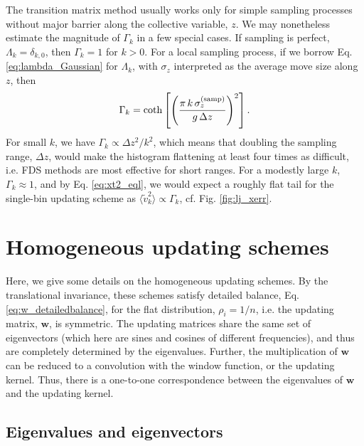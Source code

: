 \documentclass[reprint, superscriptaddress, floatfix]{revtex4-1}
\begin{document}
The transition matrix method usually works only for
simple sampling processes without major barrier
along the collective variable, $z$.
%
We may nonetheless estimate the magnitude of $\Gamma_k$
in a few special cases.
%
If sampling is perfect, $\Lambda_k = \delta_{k, 0}$,
then $\Gamma_k = 1$ for $k > 0$.
%
For a local sampling process,
if we borrow Eq. \eqref{eq:lambda_Gaussian}
for $\Lambda_k$,
with $\sigma_z$ interpreted as the average move size along $z$,
then
\begin{align}
\Gamma_k = \coth\left[
  \left(
    \frac{ \pi \, k \, \sigma_z^\mathrm{(samp)} } { g \, \Delta z}
  \right)^2
  \right].
  \notag
\end{align}
For small $k$,
we have $\Gamma_k \propto \Delta z^2/k^2$,\cite{bussi2006}
which means that doubling the sampling range, $\Delta z$,
would make the histogram flattening
at least four times as difficult,
i.e. FDS methods are most effective
for short ranges\cite{wang2001, wang2001pre}.
%
%
For a modestly large $k$,
$\Gamma_k \approx 1$,
and by Eq. \eqref{eq:xt2_eql},
we would expect a roughly flat tail
for the single-bin updating scheme
as $\langle \tilde v_k^2 \rangle \propto \Gamma_k$,
cf. Fig. \ref{fig:lj_xerr}.





\section{\label{sec:more_wband}
Homogeneous updating schemes
}


Here, we give some details
on the homogeneous updating schemes.
%
By the translational invariance,
these schemes
satisfy detailed balance,
Eq. \eqref{eq:w_detailedbalance},
for the flat distribution, $\rho_i = 1/n$,
i.e. the updating matrix, $\mathbf w$,
is symmetric.
%
The updating matrices
share the same set of eigenvectors
(which here are sines and cosines of different frequencies),
and thus are completely determined
by the eigenvalues.
%
Further, the multiplication of $\mathbf w$
can be reduced to a convolution with the window function,
or the updating kernel.
%
Thus,
there is a one-to-one correspondence between
the eigenvalues of $\mathbf w$
and the updating kernel.



\subsection{\label{sec:wband_eig}
Eigenvalues and eigenvectors}
\end{document}
